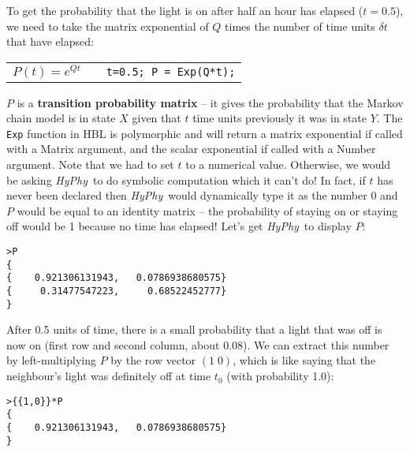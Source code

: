 \documentclass[12pt,twoside,openright]{book}
\newcommand{\hyphy}{\textit{HyPhy}}
\begin{document}
To get the probability that the light is on after half an hour has elapsed ($t = 0.5$), we need to take the matrix exponential of $Q$ times the number of time units $\delta t$ that have elapsed:

\begin{center}
\begin{tabular}{ccc}
$P(t) = e^{Q t}$
& 
\hspace{1in}
&
{\tt t=0.5; P = Exp(Q*t);}\\
\end{tabular}
\end{center}

\noindent  $P$ is a \textbf{transition probability matrix} -- it gives the probability that the Markov chain model is in state $X$ given that $t$ time units previously it was in state $Y$.  The {\tt Exp} function in HBL is polymorphic and will return a matrix exponential if called with a Matrix argument, and the scalar exponential if called with a Number argument.  Note that we had to set $t$ to a numerical value.  Otherwise, we would be asking \hyphy\ to do symbolic computation which it can't do!  In fact, if $t$ has never been declared then \hyphy\ would dynamically type it as the number 0 and $P$ would be equal to an identity matrix -- the probability of staying on or staying off would be 1 because no time has elapsed!  Let's get \hyphy\ to display $P$:

\begin{leftbar}
\begin{small}
\begin{verbatim}
>P
{
{    0.921306131943,   0.0786938680575}
{     0.31477547223,     0.68522452777}
}
\end{verbatim}
\end{small}
\end{leftbar}

\noindent After 0.5 units of time, there is a small probability that a light that was off is now on (first row and second column, about 0.08).
We can extract this number by left-multiplying $P$ by the row vector $(1\; 0)$, which is like saying that the neighbour's light was definitely off at time $t_0$ (with probability 1.0):

\begin{leftbar}
\begin{small}
\begin{verbatim}
>{{1,0}}*P
{
{    0.921306131943,   0.0786938680575}
}
\end{verbatim}
\end{small}
\end{leftbar}
\end{document}
